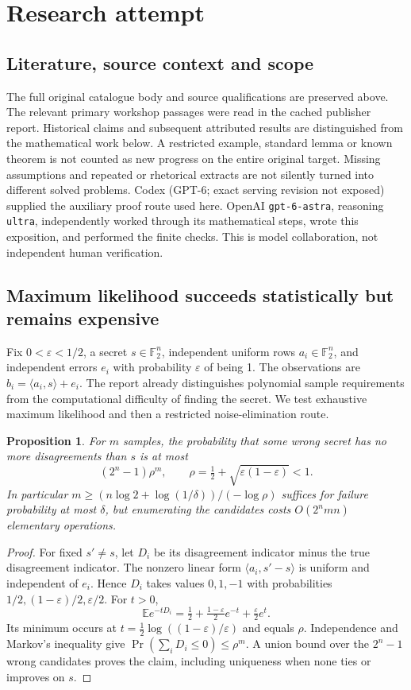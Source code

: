 \documentclass[11pt]{article}
\newtheorem{proposition}{Proposition}
\begin{document}
\section{Research attempt}
\subsection{Literature, source context and scope}
The full original catalogue body and source qualifications are preserved above. The relevant primary workshop passages were read in the cached publisher report. Historical claims and subsequent attributed results are distinguished from the mathematical work below. A restricted example, standard lemma or known theorem is not counted as new progress on the entire original target. Missing assumptions and repeated or rhetorical extracts are not silently turned into different solved problems.
Codex (GPT-6; exact serving revision not exposed) supplied the auxiliary proof route used here. OpenAI \texttt{gpt-6-astra}, reasoning \texttt{ultra}, independently worked through its mathematical steps, wrote this exposition, and performed the finite checks. This is model collaboration, not independent human verification.

\subsection{Maximum likelihood succeeds statistically but remains expensive}
Fix $0<\varepsilon<1/2$, a secret $s\in\mathbb F_2^n$, independent uniform rows $a_i\in\mathbb F_2^n$, and independent errors $e_i$ with probability $\varepsilon$ of being 1. The observations are $b_i=\langle a_i,s\rangle+e_i$. The report already distinguishes polynomial sample requirements from the computational difficulty of finding the secret. We test exhaustive maximum likelihood and then a restricted noise-elimination route.
\begin{proposition}
For $m$ samples, the probability that some wrong secret has no more disagreements than $s$ is at most
\[
(2^n-1)\rho^m,\qquad \rho=\tfrac12+\sqrt{\varepsilon(1-\varepsilon)}<1.
\]
In particular $m\ge(n\log2+\log(1/\delta))/(-\log\rho)$ suffices for failure probability at most $\delta$, but enumerating the candidates costs $O(2^nmn)$ elementary operations.
\end{proposition}
\begin{proof}
For fixed $s'\ne s$, let $D_i$ be its disagreement indicator minus the true disagreement indicator. The nonzero linear form $\langle a_i,s'-s\rangle$ is uniform and independent of $e_i$. Hence $D_i$ takes values $0,1,-1$ with probabilities $1/2,(1-\varepsilon)/2,\varepsilon/2$. For $t>0$,
\[
\mathbb E e^{-tD_i}=\tfrac12+\tfrac{1-\varepsilon}{2}e^{-t}+\tfrac{\varepsilon}{2}e^t.
\]
Its minimum occurs at $t=\frac12\log((1-\varepsilon)/\varepsilon)$ and equals $\rho$. Independence and Markov's inequality give $\Pr(\sum_iD_i\le0)\le\rho^m$. A union bound over the $2^n-1$ wrong candidates proves the claim, including uniqueness when none ties or improves on $s$.
\end{proof}
\end{document}
